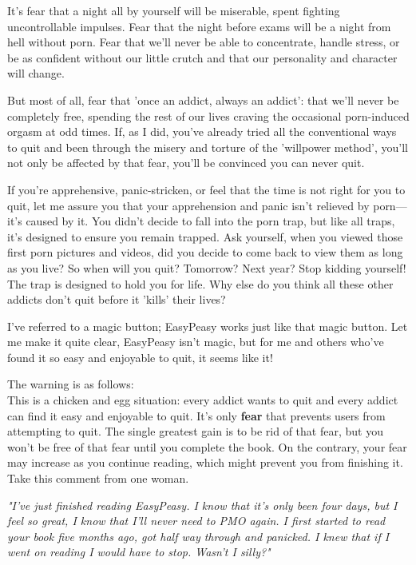 \documentclass[easypeasy.tex]{subfiles}
\begin{document}
It's fear that a night all by yourself will be miserable, spent fighting uncontrollable impulses. Fear that the night before exams will be a night from hell without porn. Fear that we'll never be able to concentrate, handle stress, or be as confident without our little crutch and that our personality and character will change.

But most of all, fear that 'once an addict, always an addict': that we'll never be completely free, spending the rest of our lives craving the occasional porn-induced orgasm at odd times. If, as I did, you've already tried all the conventional ways to quit and been through the misery and torture of the 'willpower method', you'll not only be affected by that fear, you'll be convinced you can never quit.

If you're apprehensive, panic-stricken, or feel that the time is not right for you to quit, let me assure you that your apprehension and panic isn't relieved by porn—it's caused by it. You didn't decide to fall into the porn trap, but like all traps, it's designed to ensure you remain trapped. Ask yourself, when you viewed those first porn pictures and videos, did you decide to come back to view them as long as you live? So when will you quit? Tomorrow? Next year? Stop kidding yourself! The trap is designed to hold you for life. Why else do you think all these other addicts don't quit before it 'kills' their lives?

I've referred to a magic button; EasyPeasy works just like that magic button. Let me make it quite clear, EasyPeasy isn't magic, but for me and others who've found it so easy and enjoyable to quit, it seems like it!

The warning is as follows: \\
This is a chicken and egg situation: every addict wants to quit and every addict can find it easy and enjoyable to quit. It's only \textbf{fear} that prevents users from attempting to quit. The single greatest gain is to be rid of that fear, but you won't be free of that fear until you complete the book. On the contrary, your fear may increase as you continue reading, which might prevent you from finishing it. Take this comment from one woman.

\textit{\textit{"I've just finished reading EasyPeasy. I know that it's only been four days, but I feel so great, I know that I'll never need to PMO again. I first started to read your book five months ago, got half way through and panicked. I knew that if I went on reading I would have to stop. Wasn't I silly?"}}
\end{document}
